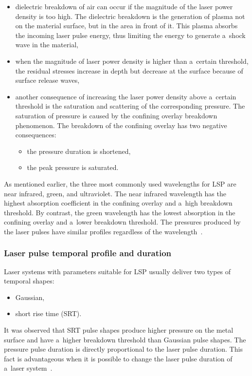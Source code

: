 \begin{itemize}

    \item dielectric breakdown of air can occur if the magnitude of the laser power density is too high. The dielectric breakdown is the generation of plasma not on the material surface, but in the area in front of it. This plasma absorbs the incoming laser pulse energy, thus limiting the energy to generate a~shock wave in the material,

    \item when the magnitude of laser power density is higher than a~certain threshold, the residual stresses increase in depth but decrease at the surface because of surface release waves,

    \item another consequence of increasing the laser power density above a~certain threshold is the saturation and scattering of the corresponding pressure. The saturation of pressure is caused by the confining overlay breakdown phenomenon. The breakdown of the confining overlay has two negative consequences: 
    
    \begin{itemize}
        \item the pressure duration is shortened,
        \item the peak pressure is saturated.
    \end{itemize}
  
  
\end{itemize}    

As mentioned earlier, the three most commonly used wavelengths for LSP are near infrared, green, and ultraviolet. The near infrared wavelength has the highest absorption coefficient in the confining overlay and a~high breakdown threshold. By contrast, the green wavelength has the lowest absorption in the confining overlay and a~lower breakdown threshold. The pressures produced by the laser pulses have similar profiles regardless of the wavelength~\cite{berthe_fabbro_peyre_bartnicki_1999}.



\subsubsection*{Laser pulse temporal profile and duration}

Laser systems with parameters suitable for LSP usually deliver two types of temporal shapes:

\begin{itemize}

    \item Gaussian,
    \item short rise time (SRT).
    
\end{itemize}
It was observed that SRT pulse shapes produce higher pressure on the metal surface and have a~higher breakdown threshold than Gaussian pulse shapes. The pressure pulse duration is directly proportional to the laser pulse duration.  This fact is advantageous when it is possible to change the laser pulse duration of a~laser system~\cite{devaux_fabbro_tollier_bartnicki_1993}. 


